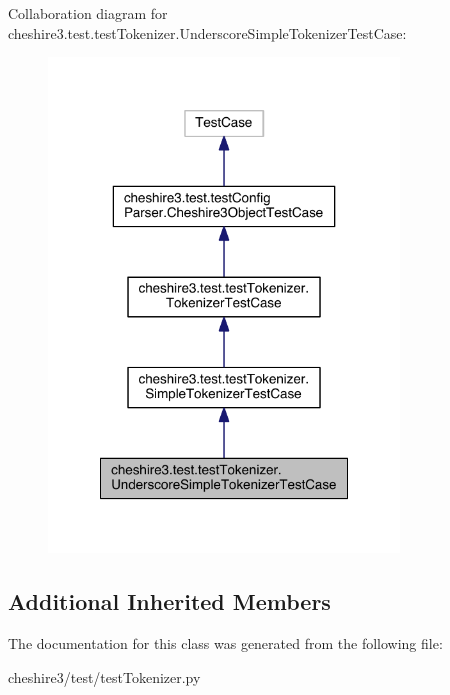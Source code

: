 Collaboration diagram for cheshire3.\-test.\-test\-Tokenizer.\-Underscore\-Simple\-Tokenizer\-Test\-Case\-:
\nopagebreak
\begin{figure}[H]
\begin{center}
\leavevmode
\includegraphics[width=264pt]{classcheshire3_1_1test_1_1test_tokenizer_1_1_underscore_simple_tokenizer_test_case__coll__graph}
\end{center}
\end{figure}
\subsection*{Additional Inherited Members}


The documentation for this class was generated from the following file\-:\begin{DoxyCompactItemize}
\item 
cheshire3/test/test\-Tokenizer.\-py\end{DoxyCompactItemize}
